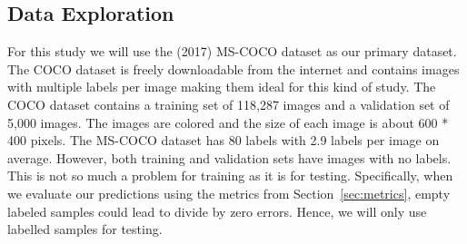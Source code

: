 \documentclass[12pt,journal,compsoc]{IEEEtran}
\begin{document}
\subsection{Data Exploration}



For this study we will use the (2017) MS-COCO\cite{MSCOCO} dataset as our primary dataset. The COCO dataset is freely downloadable from the internet and contains images with multiple labels per image making them ideal for this kind of study. The COCO dataset contains a training set of 118,287 images and a validation set of 5,000 images.  The images are colored and the size of each image is about 600 * 400 pixels.  The MS-COCO dataset has 80 labels with 2.9 labels per image on average.  However, both training and validation sets have images with no labels.  This is not so much a problem for training as it is for testing.  Specifically, when we evaluate our predictions using the metrics from Section~\ref{sec:metrics}, empty labeled samples could lead to divide by zero errors.  Hence, we will only use labelled samples for testing. 

\end{document}
